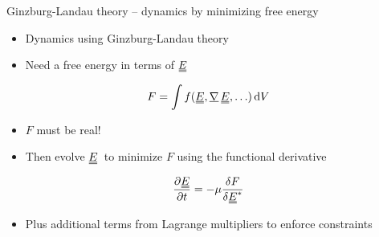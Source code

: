 \documentclass[10pt,mathserif]{beamer}
\newcommand{\suf}[2]{\stackunder[0.5pt]{\stackunder[1pt]{\ensuremath{#1}}{\rule{\widthof{\ensuremath{#2}}*\real{0.9}}{.1ex}}}{}}
\newcommand{\duf}[2]{\stackunder[0.5pt]{\stackunder[0.8pt]{\stackunder[1pt]{\ensuremath{#1}}{\rule{\widthof{\ensuremath{#2}}*\real{0.9}}{.1ex}}}{\rule{\widthof{\ensuremath{#2}}*\real{0.9}}{.1ex}}}{}}
\newcommand{\su}[1]{\suf{#1}{#1}}
\newcommand{\du}[1]{\duf{#1}{#1}}
\newcommand{\mgrad}{\ensuremath{\suf{\nabla}{K}\,}}
\newcommand{\EE}{\ensuremath{\du{E}}}
\newcommand{\extra}[1]{\color{gray} #1 \normalcolor}
\begin{document}
\begin{frame}[fragile]{Ginzburg-Landau theory -- dynamics by minimizing free energy}
    \newrefsection
    \begin{itemize}
        \item Dynamics using Ginzburg-Landau theory
        \item Need a free energy in terms of \EE
    \end{itemize}
    \begin{equation*}
        F = \int f(\du{E}, \mgrad\du{E}, \ldots) \dd{V}
    \end{equation*}
    \begin{itemize}
        \item $F$ must be real!
        \item Then evolve \EE\ to minimize $F$ using the functional derivative
    \end{itemize}
    \begin{equation*}
        \pdv{\du{E}}{t} = -\mu \fdv{F}{\EE^*}
    \end{equation*}
    \begin{itemize}
        \extra{\item Plus additional terms from Lagrange multipliers to enforce constraints}
    \end{itemize}
\end{frame}

\end{document}
